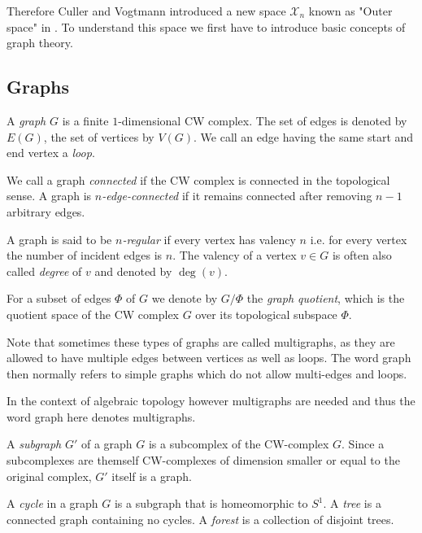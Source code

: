 Therefore Culler and Vogtmann introduced a new space $\mathcal{X}_{n}$ known as "Outer space" in \cite{vogtmann86}.
To understand this space we first have to introduce basic concepts of graph theory.

\subsection{Graphs}
\begin{definition}
	A \emph{graph} $G$ is a finite $1$-dimensional CW complex. The set of edges is denoted by $E(G)$, the set of vertices by  $V(G)$.
	We call an edge having the same start and end vertex a \emph{loop}.

	We call a graph \emph{connected} if the CW complex is connected in the topological sense.
	A graph is \emph{$n$-edge-connected} if it remains connected after removing  $n-1$ arbitrary edges.

	A graph is said to be \emph{$n$-regular} if every vertex has valency $n$ i.e. for every vertex the number of incident edges is $n$.
	The valency of a vertex $v \in G$ is often also called \emph{degree} of $v$ and denoted by $\deg(v)$.

	For a subset of edges $\Phi$ of $G$ we denote by $G / \Phi$ the \emph{graph quotient}, which is the quotient space of the CW complex $G$ over its topological subspace $\Phi$.
\end{definition}

\begin{remark}
	Note that sometimes these types of graphs are called multigraphs, as they are allowed to have multiple edges between vertices as well as loops.
	The word graph then normally refers to simple graphs which do not allow multi-edges and loops.

	In the context of algebraic topology however multigraphs are needed and thus the word graph here denotes multigraphs.
\end{remark}

\begin{definition}
	A \emph{subgraph} $G'$ of a graph $G$ is a subcomplex of the CW-complex $G$. Since a subcomplexes are themself CW-complexes of dimension smaller or equal to the original complex,
	 $G'$ itself is a graph.

	 A \emph{cycle} in a graph $G$ is a subgraph that is homeomorphic to $S^1$. A \emph{tree} is a
	 connected graph containing no cycles. A \emph{forest} is a collection of disjoint trees.
\end{definition}

